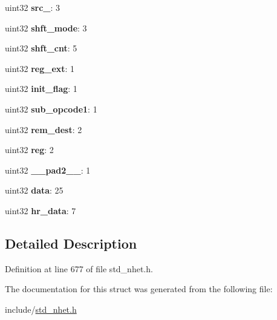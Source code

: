 \begin{DoxyCompactItemize}
uint32 {\bfseries src\+\_}\+: 3
\item 
\mbox{\label{structOR__format_a95f2efaf42a9e0cd14b7658d67c23ced}} 
uint32 {\bfseries shft\+\_\+mode}\+: 3
\item 
\mbox{\label{structOR__format_a8eb3d28765b304d66207c4bd0dae6d2b}} 
uint32 {\bfseries shft\+\_\+cnt}\+: 5
\item 
\mbox{\label{structOR__format_af1e5f1621e55fcec37a72565cc318d00}} 
uint32 {\bfseries reg\+\_\+ext}\+: 1
\item 
\mbox{\label{structOR__format_a2cc6447a26f1c8bd1952664772024120}} 
uint32 {\bfseries init\+\_\+flag}\+: 1
\item 
\mbox{\label{structOR__format_a079da0b496827b805054a2c04cd87307}} 
uint32 {\bfseries sub\+\_\+opcode1}\+: 1
\item 
\mbox{\label{structOR__format_ac606dccefcf5ea859eb59567a2165c00}} 
uint32 {\bfseries rem\+\_\+dest}\+: 2
\item 
\mbox{\label{structOR__format_aec3df4c2f6111c7a2e7983822fa21825}} 
uint32 {\bfseries reg}\+: 2
\item 
\mbox{\label{structOR__format_a140f03b45576115cf5f2929d806f7679}} 
uint32 {\bfseries \+\_\+\+\_\+pad2\+\_\+\+\_\+}\+: 1
\item 
\mbox{\label{structOR__format_aac7a98dea2523b0875dac22980ef6a7d}} 
uint32 {\bfseries data}\+: 25
\item 
\mbox{\label{structOR__format_a637f2c7a904db2eabe9d9180b0d2e819}} 
uint32 {\bfseries hr\+\_\+data}\+: 7
\end{DoxyCompactItemize}


\subsection{Detailed Description}


Definition at line 677 of file std\+\_\+nhet.\+h.



The documentation for this struct was generated from the following file\+:\begin{DoxyCompactItemize}
\item 
include/\mbox{\hyperlink{std__nhet_8h}{std\+\_\+nhet.\+h}}\end{DoxyCompactItemize}
